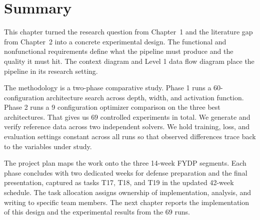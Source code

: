 \section{Summary}

This chapter turned the research question from Chapter~1 and the literature gap from Chapter~2 into a concrete experimental design. The functional and nonfunctional requirements define what the pipeline must produce and the quality it must hit. The context diagram and Level 1 data flow diagram place the pipeline in its research setting.

The methodology is a two-phase comparative study. Phase 1 runs a $60$-configuration architecture search across depth, width, and activation function. Phase 2 runs a 9 configuration optimizer comparison on the three best architectures. That gives us $69$ controlled experiments in total. We generate and verify reference data across two independent solvers. We hold training, loss, and evaluation settings constant across all runs so that observed differences trace back to the variables under study.

The project plan maps the work onto the three 14-week FYDP segments. Each phase concludes with two dedicated weeks for defense preparation and the final presentation, captured as tasks T17, T18, and T19 in the updated 42-week schedule. The task allocation assigns ownership of implementation, analysis, and writing to specific team members. The next chapter reports the implementation of this design and the experimental results from the $69$ runs.
